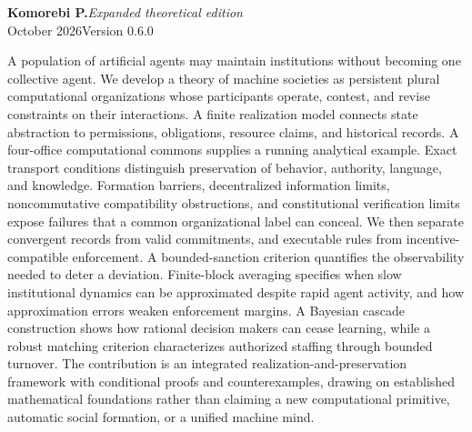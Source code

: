 \documentclass[11pt,letterpaper]{article}
\theoremstyle{plain}
\theoremstyle{definition}
\theoremstyle{remark}
\begin{document}
\hypersetup{pageanchor=false}
\begin{titlepage}
\thispagestyle{empty}
\vspace*{.25in}
\par
\vspace{.67in}
\vspace{.18in}
\vspace{.27in}
\noindent{\color{ink}\rule{\textwidth}{0.85pt}}\par
\vspace{.16in}
\noindent\textbf{Komorebi P.}\hfill\textit{Expanded theoretical edition}\\
 October 2026\hfill Version 0.6.0\par
\vspace{.48in}
\par\smallskip
\noindent A population of artificial agents may maintain institutions without becoming one collective agent. We develop a theory of machine societies as persistent plural computational organizations whose participants operate, contest, and revise constraints on their interactions. A finite realization model connects state abstraction to permissions, obligations, resource claims, and historical records. A four-office computational commons supplies a running analytical example. Exact transport conditions distinguish preservation of behavior, authority, language, and knowledge. Formation barriers, decentralized information limits, noncommutative compatibility obstructions, and constitutional verification limits expose failures that a common organizational label can conceal. We then separate convergent records from valid commitments, and executable rules from incentive-compatible enforcement. A bounded-sanction criterion quantifies the observability needed to deter a deviation. Finite-block averaging specifies when slow institutional dynamics can be approximated despite rapid agent activity, and how approximation errors weaken enforcement margins. A Bayesian cascade construction shows how rational decision makers can cease learning, while a robust matching criterion characterizes authorized staffing through bounded turnover. The contribution is an integrated realization-and-preservation framework with conditional proofs and counterexamples, drawing on established mathematical foundations rather than claiming a new computational primitive, automatic social formation, or a unified machine mind.


\end{titlepage}
\end{document}
